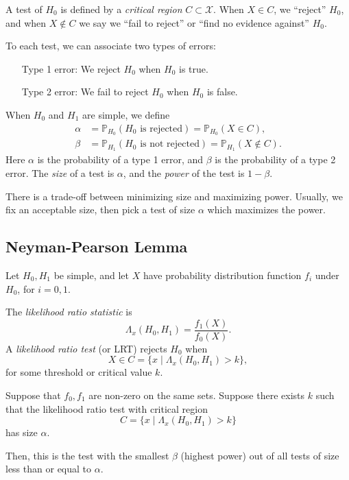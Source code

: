 \documentclass[12pt]{article}
\begin{document}
A test of $H_0$ is defined by a \emph{critical region} $C \subset \mathcal{X}$. When  $X \in C$, we ``reject'' $H_0$, and when $X \not \in C$ we say we ``fail to reject'' or ``find no evidence against'' $H_0$.

To each test, we can associate two types of errors:
\begin{itemize}
	\item[Type 1 error:] We reject $H_0$ when $H_0$ is true.
	\item[Type 2 error:] We fail to reject $H_0$ when $H_0$ is false.
\end{itemize}

When $H_0$ and $H_1$ are simple, we define
\begin{align*}
	\alpha &= \mathbb{P}_{H_0}(H_0 \text{ is rejected}) = \mathbb{P}_{H_0}(X \in C), \\
	\beta &= \mathbb{P}_{H_1}(H_0 \text{ is not rejected}) = \mathbb{P}_{H_1}(X \not \in C).
\end{align*}
Here $\alpha$ is the probability of a type 1 error, and $\beta$ is the probability of a type 2 error. The \emph{size} of a test is $\alpha$, and the \emph{power} of the test is $1 - \beta$.

There is a trade-off between minimizing size and maximizing power. Usually, we fix an acceptable size, then pick a test of size $\alpha$ which maximizes the power.

\subsection{Neyman-Pearson Lemma}
\label{sub:neyman_pearson_lemma}

Let $H_0, H_1$ be simple, and let $X$ have probability distribution function $f_i$ under $H_0$, for $i = 0, 1$.

The \emph{likelihood ratio statistic} is
\[
\Lambda_x (H_0, H_1) = \frac{f_1(X)}{f_0(X)}
.\]
A \emph{likelihood ratio test} (or LRT) rejects $H_0$ when
\[
	X \in C = \{x \mid \Lambda_x(H_0, H_1) > k\}
,\]
for some threshold or critical value $k$.

\begin{theorem}
	Suppose that $f_0, f_1$ are non-zero on the same sets. Suppose there exists $k$ such that the likelihood ratio test with critical region
	\[
		C = \{x \mid \Lambda_x(H_0, H_1) > k\}
	\]
	has size $\alpha$.

	Then, this is the test with the smallest $\beta$ (highest power) out of all tests of size less than or equal to $\alpha$.
\end{theorem}
\end{document}
